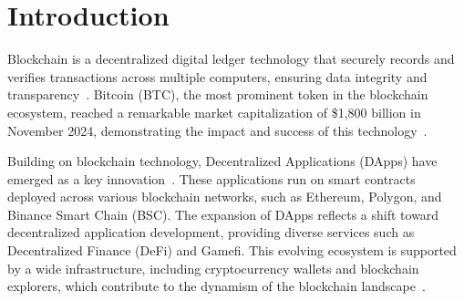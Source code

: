 


\begin{abstract}
With the rapid development of blockchain technology, transaction logs play a central role in
various applications, including decentralized exchanges, wallets, cross-chain bridges, and other
third-party services. However, these logs, particularly those based on smart contract events, are
highly susceptible to manipulation and forgery, creating substantial security risks across the
ecosystem. To address this issue, we present the first in-depth security analysis of transaction
log forgery in EVM-based blockchains, a phenomenon we term Phantom Events. We systematically model
five types of attacks and propose a tool designed to detect event forgery vulnerabilities in smart
contracts. Our evaluation demonstrates that our approach outperforms existing tools in identifying
potential phantom events. Furthermore, we have successfully identified real-world instances for all
five types of attacks across multiple decentralized applications. Finally, we call on community
developers to take proactive steps to address these critical security vulnerabilities.
\end{abstract}


\section{Introduction}
\label{Sec:Introduction}

Blockchain is a decentralized digital ledger technology that securely records and verifies transactions across multiple computers, ensuring data integrity and transparency~\cite{bitcoin}. Bitcoin (BTC), the most prominent token in the blockchain ecosystem, reached a remarkable market capitalization of \$1,800 billion in November 2024, demonstrating the impact and success of this technology~\cite{coinmarketcap}.


Building on blockchain technology, Decentralized Applications (DApps) have emerged as a key innovation~\cite{buterin2014next}. These applications run on smart contracts deployed across various blockchain networks, such as Ethereum, Polygon, and Binance Smart Chain (BSC). The expansion of DApps reflects a shift toward decentralized application development, providing diverse services such as Decentralized Finance (DeFi) and Gamefi. This evolving ecosystem is supported by a wide infrastructure, including cryptocurrency wallets and blockchain explorers, which contribute to the dynamism of the blockchain landscape~\cite{tang2022blockchain}.

